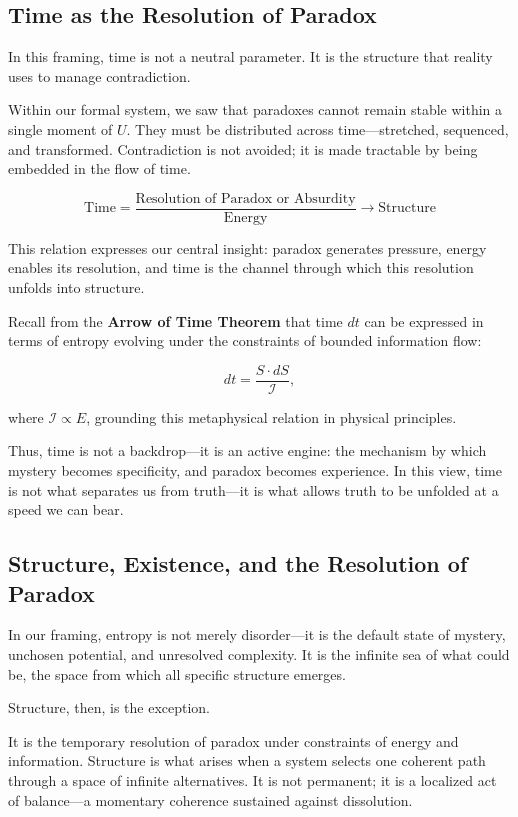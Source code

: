 \documentclass[12pt]{article}
\begin{document}
\subsection{Time as the Resolution of Paradox}

In this framing, time is not a neutral parameter. It is the structure that reality uses to manage contradiction.

Within our formal system, we saw that paradoxes cannot remain stable within a single moment of \( U \). They must be distributed across time—stretched, sequenced, and transformed. Contradiction is not avoided; it is made tractable by being embedded in the flow of time.

\[
\text{Time} = \frac{\text{Resolution of Paradox or Absurdity}}{\text{Energy}} \to \text{Structure}
\]

This relation expresses our central insight: paradox generates pressure, energy enables its resolution, and time is the channel through which this resolution unfolds into structure.

Recall from the \textbf{Arrow of Time Theorem} that time \( dt \) can be expressed in terms of entropy evolving under the constraints of bounded information flow:

\[
dt = \frac{S \cdot dS}{\mathcal{I}},
\]

where \( \mathcal{I} \propto E \), grounding this metaphysical relation in physical principles.

Thus, time is not a backdrop—it is an active engine: the mechanism by which mystery becomes specificity, and paradox becomes experience. In this view, time is not what separates us from truth—it is what allows truth to be unfolded at a speed we can bear.


\subsection{Structure, Existence, and the Resolution of Paradox}

In our framing, entropy is not merely disorder—it is the default state of mystery, unchosen potential, and unresolved complexity. It is the infinite sea of what could be, the space from which all specific structure emerges.

Structure, then, is the exception.

It is the temporary resolution of paradox under constraints of energy and information. Structure is what arises when a system selects one coherent path through a space of infinite alternatives. It is not permanent; it is a localized act of balance—a momentary coherence sustained against dissolution.
\end{document}
